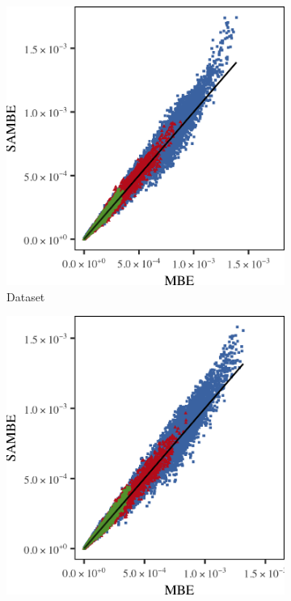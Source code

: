 \begin{figure}
	\centering
	\begin{subfigure}{0.23\textwidth}
		\centering
		\includegraphics[keepaspectratio=true, width=\textwidth, height=0.23\textheight]{discussion/img/ferdosi_2_60000_mbe_sambe.png}
		\caption{Dataset \ferdosiTwo}
		\label{fig:discussion:multisphere:mbevssambe:ferdosi2}
	\end{subfigure}
	\begin{subfigure}{0.23\textwidth}
		\centering
		\includegraphics[keepaspectratio=true, width=\textwidth, height=0.23\textheight]{discussion/img/baakman_2_60000_mbe_sambe.png}

\end{subfigure}
\end{figure}
